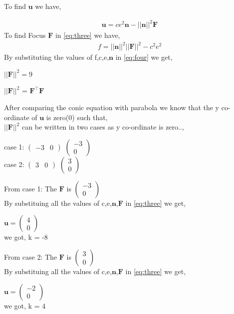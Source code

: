 \documentclass[journal,12pt,twocolumn]{IEEEtran}
\newcommand{\myvec}[1]{\ensuremath{\begin{pmatrix}#1\end{pmatrix}}}
\let\vec\mathbf
\begin{document}
To find $\vec{u}$ we have,

\begin{align}
\label{eq:three}
\vec{u}=ce^2\vec{n}-||\vec{n}||^2\vec{F}
\end{align}
To find Focus $\vec{F}$ in \eqref{eq:three} we have,
\begin{align}
\label{eq:four}
f = ||\vec{n}||^2||\vec{F}||^2-c^2e^2
\end{align}
By substituting the values of f,c,e,$\vec{n}$ in \eqref{eq:four} we get,
\begin{center}
$||\vec{F}||^2 = 9$
\end{center}

\begin{center}
$||\vec{F}||^2$ = $\vec{F^{\top}F}$
\end{center}

After comparing the conic equation with parabola we know that the y co-ordinate of $\vec{u}$ is zero(0) such that, \\


$||\vec{F}||^2$ can be written in two cases as y co-ordinate is zero..,
\begin{center}
case 1: $\myvec{-3&0}$ $\myvec{-3\\0}$ \\
case 2: $\myvec{3&0}$ $\myvec{3\\0}$ \\
\end{center}

From case 1: The $\vec{F}$ is $\myvec{-3\\0}$\\

By substituing all the values of c,e,$\vec{n}$,$\vec{F}$ in \eqref{eq:three} we get,

\begin{center}
$\vec{u} = \myvec{4 \\ 0}$ \\
we got, k = -8
\end{center}

From case 2: The $\vec{F}$ is $\myvec{3\\0}$\\

By substituing all the values of c,e,$\vec{n}$,$\vec{F}$ in \eqref{eq:three} we get,

\begin{center}
$\vec{u} = \myvec{-2 \\ 0}$ \\
 we got, k = 4
\end{center}
\end{document}
